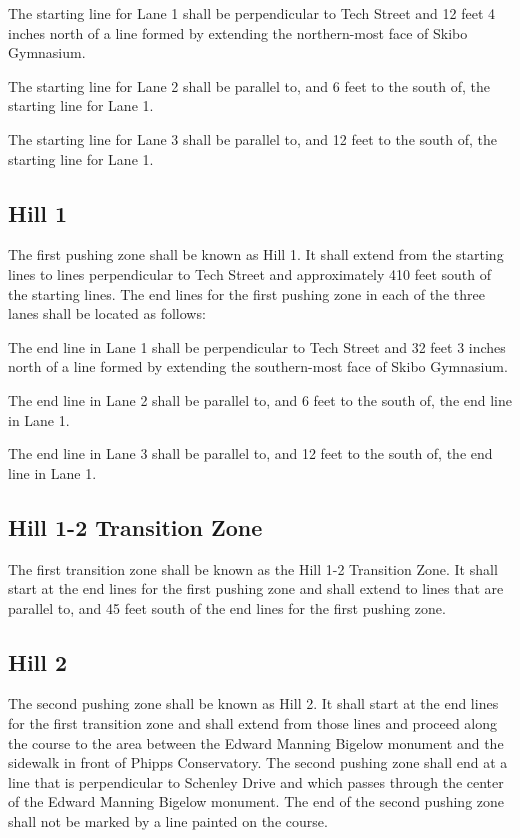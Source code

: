 \documentclass[openany]{book}
\begin{document}
The starting line for Lane 1 shall be perpendicular to Tech Street and 12 feet 4 inches north of a line formed by extending the northern-most face of Skibo Gymnasium.

The starting line for Lane 2 shall be parallel to, and 6 feet to the south of, the starting line for Lane 1.

The starting line for Lane 3 shall be parallel to, and 12 feet to the south of, the starting line for Lane 1.

\subsection{Hill 1}

The first pushing zone shall be known as Hill 1. It shall extend from the starting lines to lines perpendicular to Tech Street and approximately 410 feet south of the starting lines. The end lines for the first pushing zone in each of the three lanes shall be located as follows:

The end line in Lane 1 shall be perpendicular to Tech Street and 32 feet 3 inches north of a line formed by extending the southern-most face of Skibo Gymnasium.

The end line in Lane 2 shall be parallel to, and 6 feet to the south of, the end line in Lane 1.

The end line in Lane 3 shall be parallel to, and 12 feet to the south of, the end line in Lane 1.

\subsection{Hill 1-2 Transition Zone}

The first transition zone shall be known as the Hill 1-2 Transition Zone. It shall start at the end lines for the first pushing zone and shall extend to lines that are parallel to, and 45 feet south of the end lines for the first pushing zone.

\subsection{Hill 2}

The second pushing zone shall be known as Hill 2. It shall start at the end lines for the first transition zone and shall extend from those lines and proceed along the course to the area between the Edward Manning Bigelow monument and the sidewalk in front of Phipps Conservatory. The second pushing zone shall end at a line that is perpendicular to Schenley Drive and which passes through the center of the Edward Manning Bigelow monument. The end of the second pushing zone shall not be marked by a line painted on the course.
\end{document}
